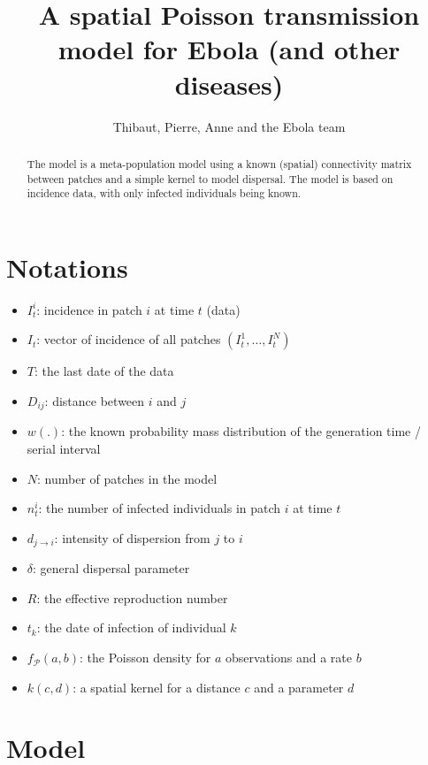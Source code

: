 \documentclass[a4paper,11pt]{article}
\title{A spatial Poisson transmission model for Ebola (and other diseases)}
\author{Thibaut, Pierre, Anne and the Ebola team}
\begin{document}
\maketitle
% 
\begin{abstract}
The model is a meta-population model using a known (spatial) connectivity matrix between patches and a simple kernel to model dispersal. 
The model is based on incidence data, with only infected individuals being known.

\end{abstract}

\newpage
\section{Notations}

\begin{itemize}
 \item $I_t^i$: incidence in patch $i$ at time $t$ (data)
 \item $I_t$: vector of incidence of all patches $(I_t^1, \ldots, I_t^N)$
 \item $T$: the last date of the data
 \item $D_{ij}$: distance between $i$ and $j$
 \item $w(.)$: the known probability mass distribution of the generation time / serial interval
 \item $N$: number of patches in the model
 \item $n_t^i$: the number of infected individuals in patch $i$ at time $t$
 \item $d_{j\rightarrow i}$: intensity of dispersion from $j$ to $i$
 \item $\delta$: general dispersal parameter
 \item $R$: the effective reproduction number
 \item $t_k$: the date of infection of individual $k$
 \item $f_\mathcal{P}(a,b)$: the Poisson density for $a$ observations and a rate $b$
 \item $k(c,d)$: a spatial kernel for a distance $c$ and a parameter $d$
\end{itemize}





\section{Model}
\end{document}
